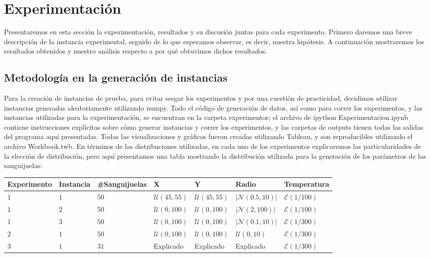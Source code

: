 \section{Experimentación}

Presentaremos en esta sección la experimentación, resultados y su discusión juntas para cada experimento. Primero daremos una breve descripción de la instancia experimental, seguido de lo que esperamos observar, es decir, nuestra hipótesis. A continuación mostraremos los resultados obtenidos y nuestro análisis respecto a por qué obtuvimos dichos resultados.

\subsection{Metodología en la generación de instancias}

Para la creación de instancias de prueba, para evitar sesgar los experimentos y por una cuestión de practicidad, decidimos utilizar instancias generadas aleatoriamente utilizando numpy. Todo el código de generación de datos, así como para correr los experimentos, y las instancias utilizadas para la experimentación, se encuentran en la carpeta experimentos; el archivo de ipython Experimentacion.ipynb contiene instrucciones explícitas sobre cómo generar instancias y correr los experimentos, y las carpetas de outputs tienen todas las salidas del programa aquí presentadas. Todas las visualizaciones y gráficos fueron creadas utilizando Tableau, y son reproducibles utilizando el archivo Workbook.twb. En términos de las distribuciones utilizadas, en cada uno de los experimentos explicaremos las particularidades de la elección de distribución, pero aquí presentamos una tabla mostrando la distribución utilizada para la generación de los parámetros de las sanguijuelas:

\begin{center}
\begin{tabular}{l | l | l | l | l | l | l}
Experimento & Instancia & \#Sanguijuelas & X & Y & Radio & Temperatura\\ \hline
$1$ & $1$ & $50$ & $\mathcal{U}(45, 55)$ & $\mathcal{U}(45, 55)$ & $|\mathcal{N}(0.5, 10)|$ & $\mathcal{E}(1/100)$\\ \hline
$1$ & $2$ & $50$ & $\mathcal{U}(0, 100)$ & $\mathcal{U}(0, 100)$ & $|\mathcal{N}(2, 100)|$ & $\mathcal{E}(1/100)$\\ \hline
$1$ & $3$ & $50$ & $\mathcal{U}(0, 100)$ & $\mathcal{U}(0, 100)$ & $|\mathcal{N}(0.1, 10)|$ & $\mathcal{E}(1/300)$\\ \hline
$2$ & $1$ & $50$ & $\mathcal{U}(0, 100)$ & $\mathcal{U}(0, 100)$ & $\mathcal{U}(0, 10)$ & $\mathcal{E}(1/300)$\\ \hline
$3$ & $1$ & $31$ & Explicado & Explicado & Explicado & $\mathcal{E}(1/300)$\\ \hline
\end{tabular}
\end{center}


